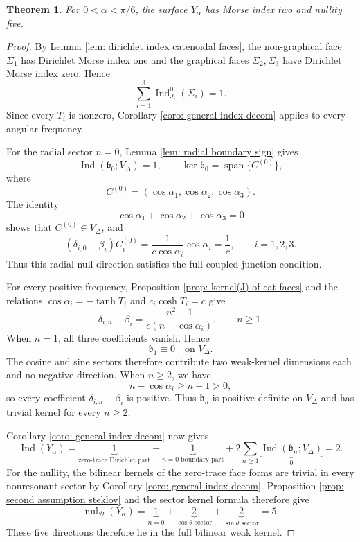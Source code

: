 \documentclass[11pt,twoside]{amsart}
\newtheorem{thm}{Theorem}[section]
\numberwithin{equation}{section}
\begin{document}
\begin{thm} \label{thm: index (0,pi/6)}
For $0<\alpha<\pi/6$, the surface $Y_\alpha$ has Morse index two and nullity five.
\end{thm}
\begin{proof}
By Lemma \ref{lem: dirichlet index catenoidal faces}, the non-graphical face $\Sigma_1$ has Dirichlet Morse index one and the graphical faces $\Sigma_2,\Sigma_3$ have Dirichlet Morse index zero. Hence
\[
\sum_{i=1}^3 \operatorname{Ind}_{J_i}^0(\Sigma_i)=1.
\]
Since every $T_i$ is nonzero, Corollary \ref{coro: general index decom} applies to every angular frequency.

For the radial sector $n=0$, Lemma \ref{lem: radial boundary sign} gives
\[
\operatorname{Ind}(\mathfrak b_0;V_\Delta)=1,
\qquad
\ker\mathfrak b_0
=\operatorname{span}\{C^{(0)}\},
\]
where
\[
C^{(0)}=(\cos\alpha_1,\cos\alpha_2,\cos\alpha_3).
\]
The identity
\[
\cos\alpha_1+\cos\alpha_2+\cos\alpha_3=0
\]
shows that $C^{(0)}\in V_\Delta$, and
\[
(\delta_{i,0}-\beta_i)C_i^{(0)}
=\frac{1}{c\cos\alpha_i}\cos\alpha_i
=\frac1c,
\qquad i=1,2,3.
\]
Thus this radial null direction satisfies the full coupled junction condition.

For every positive frequency, Proposition \ref{prop: kernel(J) of cat-faces} and the relations
$\cos\alpha_i=-\tanh T_i$ and $c_i\cosh T_i=c$ give
\[
\delta_{i,n}-\beta_i
=\frac{n^2-1}{c(n-\cos\alpha_i)},
\qquad n\ge1.
\]
When $n=1$, all three coefficients vanish. Hence
\[
\mathfrak b_1\equiv0\quad\text{on }V_\Delta.
\]
The cosine and sine sectors therefore contribute two weak-kernel dimensions each and no negative direction. When $n\ge2$, we have
\[
n-\cos\alpha_i\ge n-1>0,
\]
so every coefficient $\delta_{i,n}-\beta_i$ is positive. Thus $\mathfrak b_n$ is positive definite on $V_\Delta$ and has trivial kernel for every $n\ge2$.

Corollary \ref{coro: general index decom} now gives
\[
\operatorname{Ind}(Y_\alpha)
=\underbrace{1}_{\text{zero-trace Dirichlet part}}
+\underbrace{1}_{n=0\text{ boundary part}}
+2\sum_{n\ge1}\underbrace{\operatorname{Ind}(\mathfrak b_n;V_\Delta)}_{0}
=2.
\]
For the nullity, the bilinear kernels of the zero-trace face forms are trivial in every nonresonant sector by Corollary \ref{coro: general index decom}. Proposition \ref{prop: second assumption steklov} and the sector kernel formula therefore give
\[
\operatorname{nul}_{\mathcal D}(Y_\alpha)
=\underbrace{1}_{n=0}
+\underbrace{2}_{\cos\theta\text{ sector}}
+\underbrace{2}_{\sin\theta\text{ sector}}
=5.
\]
These five directions therefore lie in the full bilinear weak kernel.
\end{proof}
\end{document}
